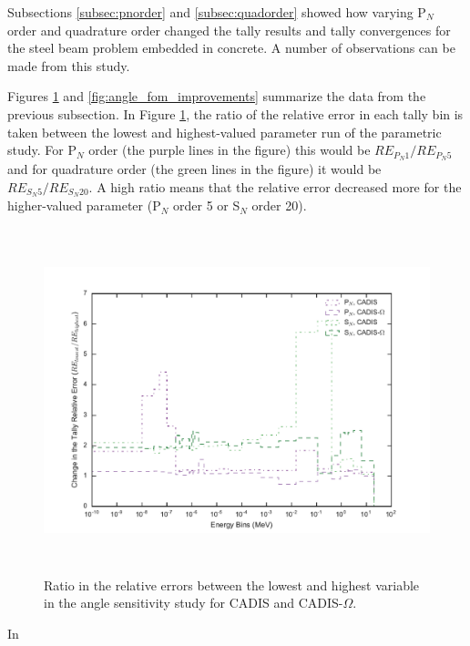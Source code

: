 Subsections \ref{subsec:pnorder} and \ref{subsec:quadorder} showed how varying
P$_N$ order and quadrature order changed the tally results and tally
convergences for the steel beam problem embedded in concrete. A number of
observations can be made from this study.

Figures \ref{fig:angle_err_improvements} and \ref{fig:angle_fom_improvements}
summarize the data from the previous subsection. In Figure
\ref{fig:angle_err_improvements}, the ratio of the relative error in each tally
bin is taken between the lowest and highest-valued parameter run of the
parametric study. For P$_N$ order (the purple lines in the figure)
this would be $RE_{P_N 1}/RE_{P_N 5}$ and for
quadrature order (the green lines in the figure) it would be $RE_{S_N 5}/
RE_{S_N 20}$. A high ratio means that the relative error decreased more for
the higher-valued parameter (P$_N$ order 5 or S$_N$ order 20).

\begin{figure}[h!]
  \centering
  \includegraphics[height=10cm]{./chapters/characterization_probs/figures/angle/prob_1/improvement_err_allmethds.pdf}
  \caption[Ratio in the relative errors between the lowest and highest variable in the angle
  sensitivity study for CADIS and CADIS-$\Omega$.]{Ratio in the relative errors between
    the lowest and highest variable in the angle sensitivity study for CADIS and CADIS-$\Omega$.}
  \label{fig:angle_err_improvements}
\end{figure}

In

